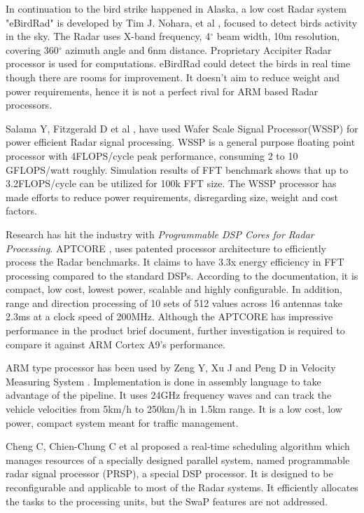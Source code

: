 In continuation to the bird strike happened in Alaska, a low cost Radar system "eBirdRad" is developed by Tim J. Nohara, et al \cite{relWork1}, focused to detect birds activity in the sky. The Radar uses X-band frequency, 4$^{\circ}$ beam width, 10m resolution, covering 360$^{\circ}$  azimuth angle and 6nm distance. Proprietary Accipiter Radar processor is used for computations. eBirdRad could detect the birds in real time though there are rooms for improvement. It doesn't aim to reduce weight and power requirements, hence it is not a perfect rival for ARM based Radar processors. 

Salama Y, Fitzgerald D et al \cite{relWork3}, have used Wafer Scale Signal Processor(WSSP) for power efficient Radar signal processing. WSSP is a general purpose floating point processor with 4FLOPS/cycle peak performance, consuming 2 to 10 GFLOPS/watt roughly. Simulation results of FFT benchmark shows that up to 3.2FLOPS/cycle can be utilized for 100k FFT size. The WSSP processor has made efforts to reduce power requirements, disregarding size, weight and cost factors.

Research has hit the industry with \textsl{Programmable DSP Cores for Radar Processing}. APTCORE \cite{relWork4}, uses patented processor architecture to efficiently process the Radar benchmarks. It claims to have 3.3x energy efficiency in FFT processing compared to the standard DSPs. According to the documentation, it is compact, low cost, lowest power, scalable and highly configurable. In addition, range and direction processing of 10 sets of 512 values across 16 antennas take 2.3ms at a clock speed of 200MHz. Although the APTCORE has impressive performance in the product brief document, further investigation is required to compare it against ARM Cortex A9's performance.

ARM type processor has been used by Zeng Y, Xu J and Peng D in Velocity Measuring System \cite{relWork2}. Implementation is done in assembly language to take advantage of the pipeline. It uses 24GHz frequency waves and can track the vehicle velocities from 5km/h to 250km/h in 1.5km range. It is a low cost, low power, compact system meant for traffic management.

Cheng C, Chien-Chung C et al \cite{RTsched} proposed a real-time scheduling algorithm which manages resources of a specially designed parallel system, named programmable radar signal processor (PRSP), a special DSP processor. It is designed to be reconfigurable and applicable to most of the Radar systems. It efficiently allocates the tasks to the processing units, but the SwaP features are not addressed.

